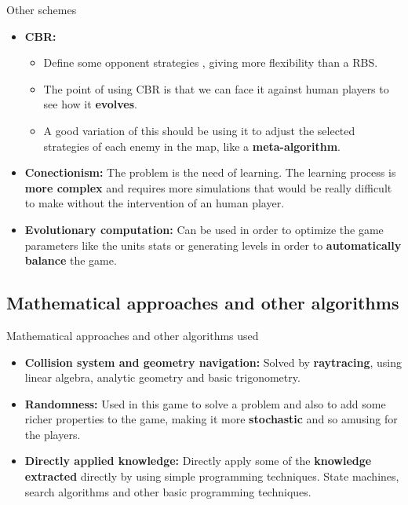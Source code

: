 \documentclass[10pt]{beamer}
\begin{document}
	      \begin{frame}{Other schemes}
	       \footnotesize
		  \begin{itemize}
		   \item \textbf{CBR:}
		    \begin{itemize}
		    \footnotesize
		      \item Define some opponent strategies , giving more flexibility than a RBS.
		      \item The point of using CBR is that we can face it against human players to see how it \textbf{evolves}.
		      \item A good variation of this should be using it to adjust the selected strategies of each enemy in the map, like a \textbf{meta-algorithm}.\newline
		    \end{itemize}

		    \item \textbf{Conectionism:} The problem is the need of learning. The learning process is \textbf{more complex} and requires more simulations that would be really difficult to make without the intervention of an human player.\newline

		    \item \textbf{Evolutionary computation:} Can be used in order to optimize the game parameters like the units stats or generating levels in order to \textbf{automatically balance} the game.
		  \end{itemize}
	      \end{frame}

	    \subsection{Mathematical approaches and other algorithms}

	      \begin{frame}{Mathematical approaches and other algorithms used}
	       \begin{itemize}
		   \item \textbf{Collision system and geometry navigation:} Solved by \textbf{raytracing}, using linear algebra, analytic geometry and basic trigonometry.\newline
		   \item \textbf{Randomness:} Used in this game to solve a problem and also to add some richer properties to the game, making it more \textbf{stochastic} and so amusing for the players.\newline
		   \item \textbf{Directly applied knowledge:} Directly apply some of the \textbf{knowledge extracted} directly by using simple programming techniques. State machines, search algorithms and other basic programming techniques.
		    \end{itemize}
	      \end{frame}
\end{document}
